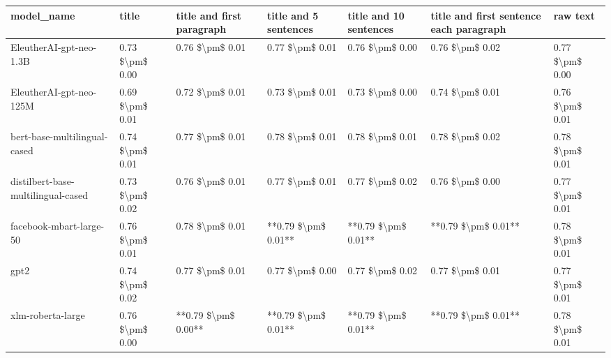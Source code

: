 \begin{tabular}{lllllll}
\toprule
                        model\_name &           title & title and first paragraph & title and 5 sentences & title and 10 sentences & title and first sentence each paragraph &        raw text \\
\midrule
           EleutherAI-gpt-neo-1.3B & 0.73 \$\textbackslash pm\$ 0.00 &           0.76 \$\textbackslash pm\$ 0.01 &       0.77 \$\textbackslash pm\$ 0.01 &        0.76 \$\textbackslash pm\$ 0.00 &                         0.76 \$\textbackslash pm\$ 0.02 & 0.77 \$\textbackslash pm\$ 0.00 \\
           EleutherAI-gpt-neo-125M & 0.69 \$\textbackslash pm\$ 0.01 &           0.72 \$\textbackslash pm\$ 0.01 &       0.73 \$\textbackslash pm\$ 0.01 &        0.73 \$\textbackslash pm\$ 0.00 &                         0.74 \$\textbackslash pm\$ 0.01 & 0.76 \$\textbackslash pm\$ 0.01 \\
      bert-base-multilingual-cased & 0.74 \$\textbackslash pm\$ 0.01 &           0.77 \$\textbackslash pm\$ 0.01 &       0.78 \$\textbackslash pm\$ 0.01 &        0.78 \$\textbackslash pm\$ 0.01 &                         0.78 \$\textbackslash pm\$ 0.02 & 0.78 \$\textbackslash pm\$ 0.01 \\
distilbert-base-multilingual-cased & 0.73 \$\textbackslash pm\$ 0.02 &           0.76 \$\textbackslash pm\$ 0.01 &       0.77 \$\textbackslash pm\$ 0.01 &        0.77 \$\textbackslash pm\$ 0.02 &                         0.76 \$\textbackslash pm\$ 0.00 & 0.77 \$\textbackslash pm\$ 0.01 \\
           facebook-mbart-large-50 & 0.76 \$\textbackslash pm\$ 0.01 &           0.78 \$\textbackslash pm\$ 0.01 &   **0.79 \$\textbackslash pm\$ 0.01** &    **0.79 \$\textbackslash pm\$ 0.01** &                     **0.79 \$\textbackslash pm\$ 0.01** & 0.78 \$\textbackslash pm\$ 0.01 \\
                              gpt2 & 0.74 \$\textbackslash pm\$ 0.02 &           0.77 \$\textbackslash pm\$ 0.01 &       0.77 \$\textbackslash pm\$ 0.00 &        0.77 \$\textbackslash pm\$ 0.02 &                         0.77 \$\textbackslash pm\$ 0.01 & 0.77 \$\textbackslash pm\$ 0.01 \\
                 xlm-roberta-large & 0.76 \$\textbackslash pm\$ 0.00 &       **0.79 \$\textbackslash pm\$ 0.00** &   **0.79 \$\textbackslash pm\$ 0.01** &    **0.79 \$\textbackslash pm\$ 0.01** &                     **0.79 \$\textbackslash pm\$ 0.01** & 0.78 \$\textbackslash pm\$ 0.01 \\
\bottomrule
\end{tabular}
